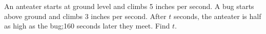 An anteater starts at ground level and climbs 5 inches per second. A bug starts above ground and climbs 3 inches per second. After $t$ seconds, the anteater is half as high as the bug;160 seconds later they meet. Find $t$.
